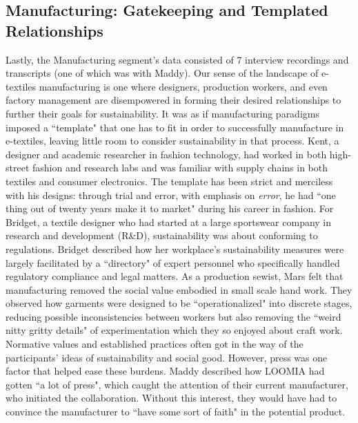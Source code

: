 \subsection{Manufacturing: Gatekeeping and Templated Relationships}
Lastly, the Manufacturing segment's data consisted of 7 interview recordings and transcripts (one of which was with Maddy). 
Our sense of the landscape of e-textiles manufacturing is one where designers, production workers, and even factory management are disempowered in forming their desired relationships to further their goals for sustainability. It was as if manufacturing paradigms imposed a ``template" that one has to fit in order to successfully manufacture in e-textiles, leaving little room to consider sustainability in that process. Kent, a designer and academic researcher in fashion technology, had worked in both high-street fashion and research labs and was familiar with supply chains in both textiles and consumer electronics. The template has been strict and merciless with his designs: through trial and error, with emphasis on \textit{error}, he had ``one thing out of twenty years make it to market" during his career in fashion. For Bridget, a textile designer who had started at a large sportswear company in research and development (R\&D), sustainability was about conforming to regulations. Bridget described how her workplace's sustainability measures were largely facilitated by a ``directory" of expert personnel who specifically handled regulatory compliance and legal matters. As a production sewist, Mars felt that manufacturing removed the social value embodied in small scale hand work. They observed how garments were designed to be ``operationalized" into discrete stages, reducing possible inconsistencies between workers but also removing the ``weird nitty gritty details" of experimentation which they so enjoyed about craft work. Normative values and established practices often got in the way of the participants' ideas of sustainability and social good.  However, press was one factor that helped ease these burdens. Maddy described how LOOMIA had gotten ``a lot of press", which caught the attention of their current manufacturer, who initiated the collaboration. Without this interest, they would have had to convince the manufacturer to ``have some sort of faith" in the potential product. 

